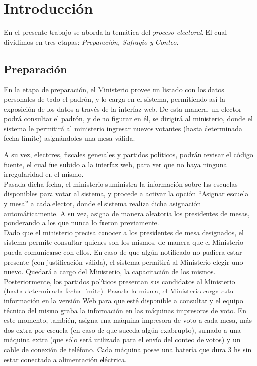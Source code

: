 \section{Introducci\'on}

En el presente trabajo se aborda la tem\'atica del \emph{proceso electoral}. El cual dividimos en tres etapas: \textit{Preparaci\'on, Sufragio y Conteo}.\\


\subsection{Preparación}

En la etapa de preparación, el Ministerio provee un listado con los datos personales de todo el padrón, y lo carga en el sistema, permitiendo así la exposición de los datos a través de la interfaz web. De esta manera, un elector podrá consultar el padrón, y de no figurar en él, se dirigirá al ministerio, donde el sistema le permitirá al ministerio ingresar nuevos votantes  (hasta determinada fecha límite) asignándoles una mesa válida. 

A su vez, electores, fiscales generales y partidos políticos, podrán revisar el código fuente, el cual fue subido a la interfaz web, para ver que no haya ninguna irregularidad en el mismo.\\

Pasada dicha fecha, el ministerio suministra la información sobre las escuelas disponibles para votar al sistema, y procede a activar la opción “Asignar escuela y mesa” a cada elector, donde el sistema realiza dicha asignación automáticamente. A su vez, asigna de manera aleatoria los presidentes de mesas, ponderando a los que nunca lo fueron previamente.\\

Dado que el ministerio precisa conocer a los presidentes de mesa designados, el sistema permite consultar quienes son los mismos, de manera que el Ministerio pueda comunicarse con ellos. En caso de que algún notificado no pudiera estar presente (con justificación válida), el sistema permitirá al Ministerio elegir uno nuevo. Quedará a cargo del Ministerio, la capacitación de los mismos.\\

Posteriormente, los partidos políticos presentan sus candidatos al Ministerio (hasta determinada fecha límite). Pasada la misma, el Ministerio carga esta información en la versión Web para que esté disponible a consultar y el equipo técnico del mismo graba la información en las máquinas impresoras de voto. En este momento, también, asigna una máquina impresora de voto a cada mesa, más dos extra por escuela (en caso de que suceda algún exabrupto), sumado a una máquina extra (que sólo será utilizada para el envío del conteo de votos) y un cable de conexión de teléfono. Cada máquina posee una batería que dura 3 hs sin estar conectada a alimentación eléctrica. 

